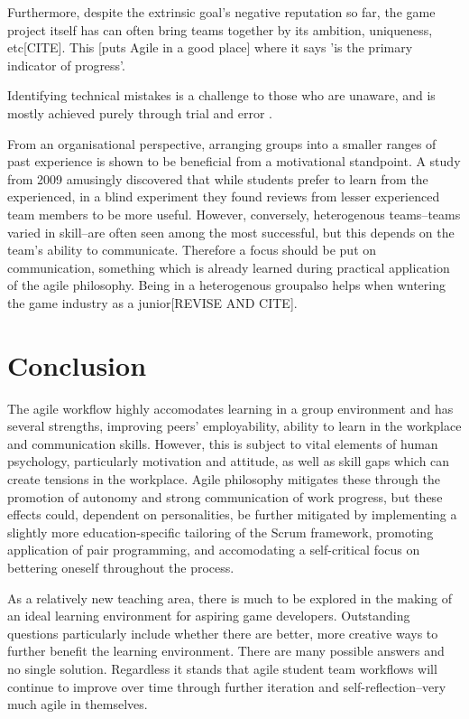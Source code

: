 \documentclass{scrartcl}
\begin{document}
Furthermore, despite the extrinsic goal's negative reputation so far, the game project itself has can often bring teams together by its ambition, uniqueness, etc[CITE]. This [puts Agile in a good place] where it says 'is the primary indicator of progress'.

Identifying technical mistakes is a challenge to those who are unaware, and is mostly achieved purely through trial and error \cite{capstone}. 

From an organisational perspective, arranging groups into a smaller ranges of past experience is shown to be beneficial from a motivational standpoint. A study from 2009 \cite{peerreview} amusingly discovered that while students prefer to learn from the experienced, in a blind experiment they found reviews from lesser experienced team members to be more useful.\cite{peerreview} However, conversely, heterogenous teams--teams varied in skill--are often seen among the most successful, but this depends on the team's ability to communicate. \cite{group2003} Therefore a focus should be put on communication, something which is already learned during practical application of the agile philosophy. Being in a heterogenous groupalso helps when wntering the game industry as a junior[REVISE AND CITE].

\section{Conclusion}
The agile workflow highly accomodates learning in a group environment and has several strengths, improving peers' employability, ability to learn in the workplace and communication skills. However, this is subject to vital elements of human psychology, particularly motivation and attitude, as well as skill gaps which can create tensions in the workplace. Agile philosophy mitigates these through the promotion of autonomy and strong communication of work progress, but these effects could, dependent on personalities, be further mitigated by implementing a slightly more education-specific tailoring of the Scrum framework, promoting application of pair programming, and accomodating a self-critical focus on bettering oneself throughout the process.

As a relatively new teaching area, there is much to be explored in the making of an ideal learning environment for aspiring game developers. Outstanding questions particularly include whether there are better, more creative ways to further benefit the learning environment. There are many possible answers and no single solution. Regardless it stands that agile student team workflows will continue to improve over time through further iteration and self-reflection--very much agile in themselves.

 

\end{document}
